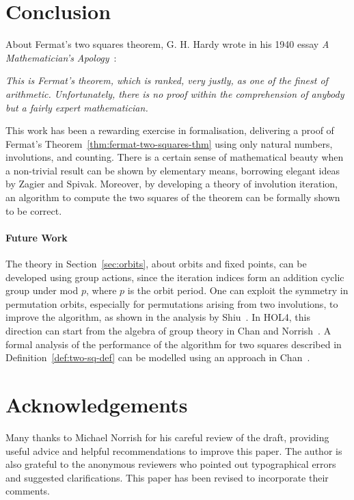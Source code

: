 \documentclass[sigplan,screen]{acmart}
\renewcommand{\HOLConst}[1]{{\fontsize{9pt}{1em}\selectfont\textsf{\upshape #1}}}
\newenvironment{mquote}[1][2em]%
  {\list{}{\leftmargin=#1\rightmargin=#1}\item[]}%
  {\endlist}
\begin{document}
\section{Conclusion}
\label{sec:conclusion}
About Fermat's two squares theorem,
G. H. Hardy wrote in his 1940 essay \emph{A Mathematician's Apology}~\cite[Section 13]{Hardy-1940-acm}:

\bigskip
\begin{mquote}[1em] %
\textit{This is Fermat's theorem, which is ranked, very justly, as one of the finest of arithmetic. Unfortunately, there is no proof within the comprehension of anybody but a fairly expert mathematician.}
\end{mquote}

\bigskip
\noindent
This work has been a rewarding exercise in formalisation,
delivering a proof of Fermat's Theorem~\ref{thm:fermat-two-squares-thm} using only natural numbers, involutions, and counting.
There is a certain sense of mathematical beauty when a non-trivial result can be shown by elementary means, borrowing elegant ideas by Zagier and Spivak.
Moreover, by developing a theory of involution iteration, an algorithm to compute the two squares of the theorem can be formally shown to be correct.

\paragraph*{Future Work}
The theory in Section~\ref{sec:orbits}, about orbits and fixed points, can be developed using group actions, since the iteration indices form an addition cyclic group under \HOLConst{mod} $p$, where $p$ is the orbit period. 
One can exploit the symmetry in permutation orbits, especially for permutations arising from two involutions, to improve the algorithm, as shown in the analysis by Shiu~\cite{Shiu-1996}. 
In HOL4, this direction can start from the algebra of group theory in Chan and Norrish~\cite{Chan-Norrish-cpp-2012}.
A formal analysis of the performance of the algorithm for two squares described in Definition~\ref{def:two-sq-def} can be modelled using an approach in Chan~\cite{Chan-ANU-2019-acm}.

\ifdefined\READY
\section*{Acknowledgements}
\label{sec:acknowledgements}
Many thanks to Michael Norrish for his careful review of the draft, providing useful advice and helpful recommendations to improve this paper.
The author is also grateful to the anonymous reviewers who pointed out typographical errors and suggested clarifications.
This paper has been revised to incorporate their comments.
\else
\fi
\end{document}
